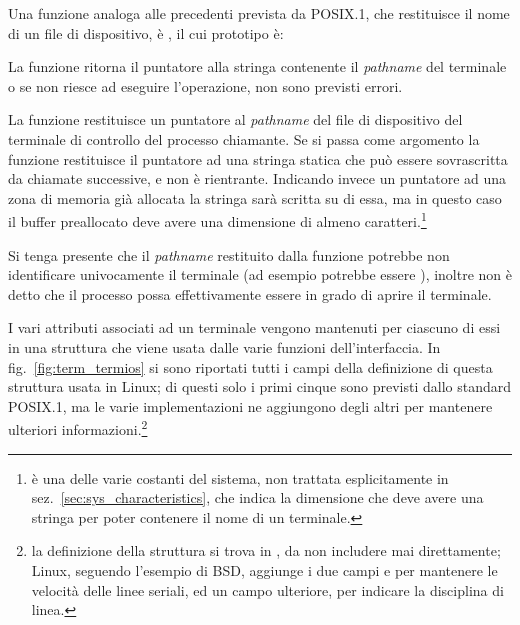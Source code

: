 Una funzione analoga alle precedenti prevista da POSIX.1, che restituisce il
nome di un file di dispositivo, è , il cui prototipo è:

\begin{funcproto}{
}

{La funzione ritorna il puntatore alla stringa contenente il \textit{pathname}
  del terminale o  se non riesce ad eseguire l'operazione, non sono
  previsti errori.}
\end{funcproto}

La funzione restituisce un puntatore al \textit{pathname} del file di
dispositivo del terminale di controllo del processo chiamante.  Se si passa
come argomento  la funzione restituisce il puntatore ad una stringa
statica che può essere sovrascritta da chiamate successive, e non è
rientrante. Indicando invece un puntatore ad una zona di memoria già allocata
la stringa sarà scritta su di essa, ma in questo caso il buffer preallocato
deve avere una dimensione di almeno 
caratteri.\footnote{ è una delle varie costanti del sistema,
  non trattata esplicitamente in sez.~\ref{sec:sys_characteristics}, che
  indica la dimensione che deve avere una stringa per poter contenere il nome
  di un terminale.}

Si tenga presente che il \textit{pathname} restituito dalla funzione potrebbe
non identificare univocamente il terminale (ad esempio potrebbe essere
), inoltre non è detto che il processo possa effettivamente
essere in grado di aprire il terminale.

I vari attributi associati ad un terminale vengono mantenuti per ciascuno di
essi in una struttura  che viene usata dalle varie funzioni
dell'interfaccia. In fig.~\ref{fig:term_termios} si sono riportati tutti i
campi della definizione di questa struttura usata in Linux; di questi solo i
primi cinque sono previsti dallo standard POSIX.1, ma le varie implementazioni
ne aggiungono degli altri per mantenere ulteriori informazioni.\footnote{la
  definizione della struttura si trova in , da non
  includere mai direttamente; Linux, seguendo l'esempio di BSD, aggiunge i due
  campi  e  per mantenere le velocità delle
  linee seriali, ed un campo ulteriore,  per indicare la
  disciplina di linea.}


